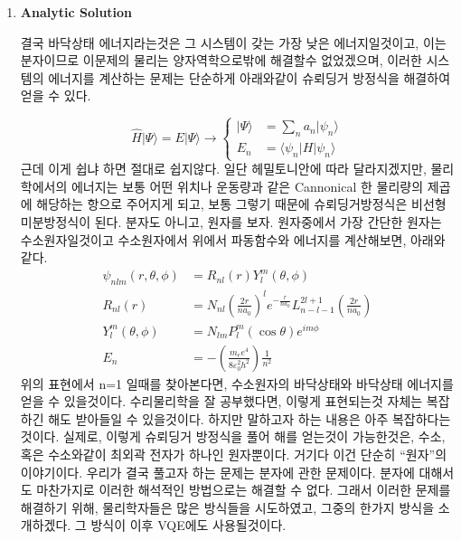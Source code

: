 \documentclass[10pt]{article}
\begin{document}
\begin{enumerate}[label=\arabic*)]
\item {\Large \textbf{Analytic Solution}}

결국 바닥상태 에너지라는것은 그 시스템이 갖는 가장 낮은 에너지일것이고, 이는 분자이므로 이문제의 물리는 양자역학으로밖에 해결할수 없었겠으며, 
이러한 시스템의 에너지를 계산하는 문제는 단순하게 아래와같이 슈뢰딩거 방정식을 해결하여 얻을 수 있다. 

\[
\hat{H}|\Psi\rangle = E|\Psi\rangle \longrightarrow
\left\{
\begin{aligned}
|\Psi\rangle &= \sum_n a_n |\psi_n \rangle \\
E_n &= \langle \psi_n | H | \psi_n \rangle
\end{aligned}
\right.
\]
근데 이게 쉽냐 하면 절대로 쉽지않다.  
일단 헤밀토니안에 따라 달라지겠지만, 물리학에서의 에너지는 보통 어떤 위치나 운동량과 같은 Cannonical 한 물리량의 제곱에 해당하는 항으로 주어지게 되고, 
보통 그렇기 때문에 슈뢰딩거방정식은 비선형 미분방정식이 된다. 
분자도 아니고, 원자를 보자. 원자중에서 가장 간단한 원자는 수소원자일것이고 
수소원자에서 위에서 파동함수와 에너지를 계산해보면, 아래와같다.
\begin{align*}
\psi_{nlm}(r, \theta, \phi) &= R_{nl}(r) Y_l^m(\theta, \phi) \\
R_{nl}(r) &= N_{nl} \left(\frac{2r}{na_0}\right)^l e^{-\frac{r}{na_0}} L_{n-l-1}^{2l+1}\left(\frac{2r}{na_0}\right) \\
Y_l^m(\theta, \phi) &= N_{lm} P_l^m(\cos \theta) e^{im\phi} \\
E_n &= -\left(\frac{m_e e^4}{8 \varepsilon_0^2 h^2}\right) \frac{1}{n^2}
\end{align*}
위의 표현에서 n=1 일때를 찾아본다면, 수소원자의 바닥상태와 바닥상태 에너지를 얻을 수 있을것이다. 
수리물리학을 잘 공부했다면, 이렇게 표현되는것 자체는 복잡하긴 해도 받아들일 수 있을것이다. 
하지만 말하고자 하는 내용은 아주 복잡하다는것이다. 
실제로, 이렇게 슈뢰딩거 방정식을 풀어 해를 얻는것이 가능한것은, 수소, 혹은 수소와같이 최외곽 전자가 하나인 원자뿐이다. 
거기다 이건 단순히 “원자”의 이야기이다. 우리가 결국 풀고자 하는 문제는 분자에 관한 문제이다. 분자에 대해서도 마찬가지로 이러한 해석적인 방법으로는 해결할 수 없다. 
그래서 이러한 문제를 해결하기 위해, 물리학자들은 많은 방식들을 시도하였고, 그중의 한가지 방식을 소개하겠다. 그 방식이 이후 VQE에도 사용될것이다. 
\end{enumerate}
\end{document}
